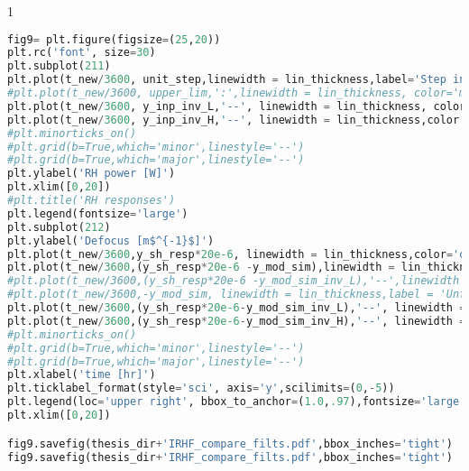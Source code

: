 
\begin{spacing}{1} \begin{lstlisting}[language=Python]
fig9= plt.figure(figsize=(25,20))
plt.rc('font', size=30)
plt.subplot(211)
plt.plot(t_new/3600, unit_step,linewidth = lin_thickness,label='Step input', color= 'purple')
#plt.plot(t_new/3600, upper_lim,':',linewidth = lin_thickness, color='magenta', label='RH upper limit')
plt.plot(t_new/3600, y_inp_inv_L,'--', linewidth = lin_thickness, color = 'green',label='Filtered input(H$^{-1}$(s)G$_{2}$(s))')
plt.plot(t_new/3600, y_inp_inv_H,'--', linewidth = lin_thickness,color = 'red', label='Filtered input (H$^{-1}$(s)G$_{1}$(s))')
#plt.minorticks_on()
#plt.grid(b=True,which='minor',linestyle='--')
#plt.grid(b=True,which='major',linestyle='--')
plt.ylabel('RH power [W]')
plt.xlim([0,20])
#plt.title('RH responses')
plt.legend(fontsize='large')
plt.subplot(212)
plt.ylabel('Defocus [m$^{-1}$]')
plt.plot(t_new/3600,y_sh_resp*20e-6, linewidth = lin_thickness,color='orange',label ='self heating with no RH')
plt.plot(t_new/3600,(y_sh_resp*20e-6 -y_mod_sim),linewidth = lin_thickness,label='self heating + RH w/ step input',color='purple')
#plt.plot(t_new/3600,(y_sh_resp*20e-6 -y_mod_sim_inv_L),'--',linewidth = lin_thickness,label='self heating + RH w/ filtered input',color='green')
#plt.plot(t_new/3600,-y_mod_sim, linewidth = lin_thickness,label = 'Unfiltered step input',color='purple')
plt.plot(t_new/3600,(y_sh_resp*20e-6-y_mod_sim_inv_L),'--', linewidth = lin_thickness,color='green',label ='Filtered input (H$^{-1}$(s)G$_{2}$(s))')
plt.plot(t_new/3600,(y_sh_resp*20e-6-y_mod_sim_inv_H),'--', linewidth = lin_thickness,color='red',label ='Filtered input (H$^{-1}$(s)G$_{1}$(s))')
#plt.minorticks_on()
#plt.grid(b=True,which='minor',linestyle='--')
#plt.grid(b=True,which='major',linestyle='--')
plt.xlabel('time [hr]')
plt.ticklabel_format(style='sci', axis='y',scilimits=(0,-5))
plt.legend(loc='upper right', bbox_to_anchor=(1.0,.97),fontsize='large')
plt.xlim([0,20])

fig9.savefig(thesis_dir+'IRHF_compare_filts.pdf',bbox_inches='tight')
fig9.savefig(thesis_dir+'IRHF_compare_filts.pdf',bbox_inches='tight')
\end{lstlisting} \end{spacing}


